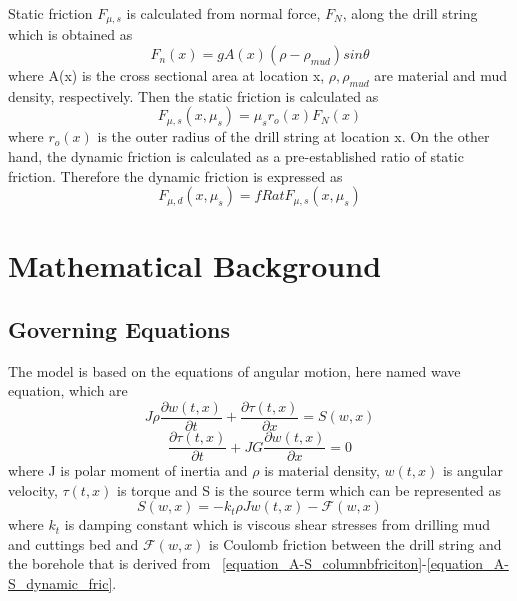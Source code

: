 Static friction $F_{\mu,s}$ is calculated from normal force, $F_N$, along the drill string which is obtained as
\begin{equation}\label{equation_AS_normal_force}
  F_n(x) = gA(x)(\rho-\rho_{mud})sin\theta
\end{equation}
where A(x) is the cross sectional area at location x,  $\rho, \rho_{mud}$ are material and mud density, respectively.
Then the static friction is calculated as
\begin{equation}\label{equation_A-S_static_fric}
  F_{\mu,s}(x,\mu_s) = \mu_sr_o(x)F_N(x)
\end{equation}
where $r_o(x)$ is the outer radius of the drill string at location x.
On the other hand, the dynamic friction is calculated as a pre-established ratio of static friction. Therefore the dynamic friction is expressed as
\begin{equation}\label{equation_A-S_dynamic_fric}
  F_{\mu,d}(x,\mu_s) = fRat F_{\mu,s}(x,\mu_s)
\end{equation}
\section{Mathematical Background}\label{SubSec_AS_mathematicalbackground}
\subsection{Governing Equations}
The model is based on the equations of angular motion, here named wave equation, which are
\begin{equation}\label{AS-motion}
  J\rho\frac{\partial w(t,x)}{\partial t} + \frac{\partial \tau (t,x)}{\partial x} = S(w,x)
\end{equation}
\begin{equation}\label{AS-motion1}
 \frac{\partial\tau(t,x)}{\partial t} + JG\frac{\partial w(t,x)}{\partial x} = 0
\end{equation}
where J is polar moment of inertia and $\rho$ is material density, $w(t,x)$ is angular velocity, $\tau(t,x)$ is torque and S is the source term which can be represented as
\begin{equation}\label{AS-sourceterm}
  S(w,x) = -k_t \rho J w(t,x) - \mathcal{F}(w,x)
\end{equation}
where $k_t$ is damping constant which is viscous shear stresses from drilling mud and cuttings bed and $\mathcal{F}(w,x)$ is Coulomb friction between the drill string and the borehole that is derived from \equationname~\ref{equation_A-S_columnbfriciton}-\ref{equation_A-S_dynamic_fric}.

